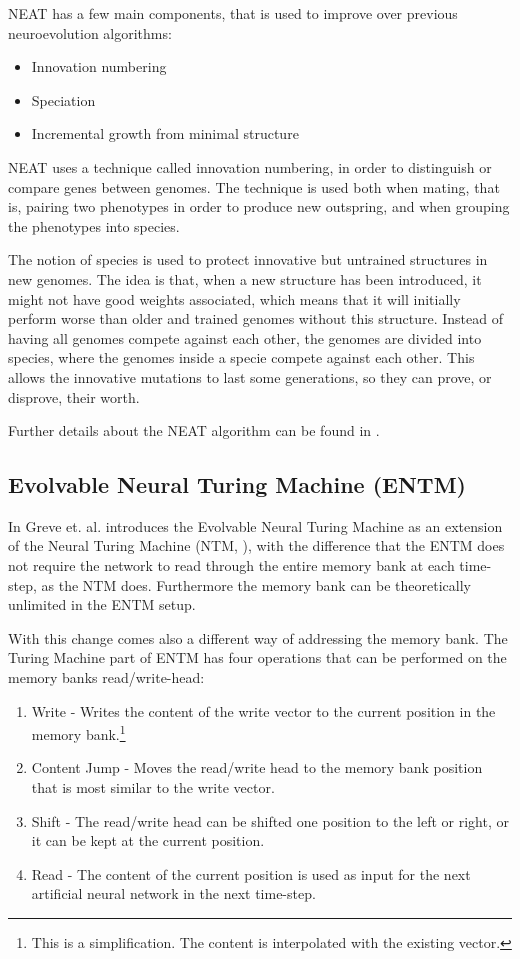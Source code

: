 \newpar NEAT has a few main components, that is used to improve over previous neuroevolution algorithms:

\begin{itemize}
	\item Innovation numbering
	\item Speciation
	\item Incremental growth from minimal structure
\end{itemize}

\newpar NEAT uses a technique called innovation numbering, in order to distinguish or compare genes between genomes. The technique is used both when mating, that is, pairing two phenotypes in order to produce new outspring, and when grouping the phenotypes into species.

\newpar The notion of species is used to protect innovative but untrained structures in new genomes. The idea is that, when a new structure has been introduced, it might not have good weights associated, which means that it will initially perform worse than older and trained genomes without this structure. Instead of having all genomes compete against each other, the genomes are divided into species, where the genomes inside a specie compete against each other. This allows the innovative mutations to last some generations, so they can prove, or disprove, their worth.

\newpar Further details about the NEAT algorithm can be found in \cite{stanley2002evolving}.

\subsection{Evolvable Neural Turing Machine (ENTM)}
In \cite{greve2016evolving} Greve et. al. introduces the Evolvable Neural Turing Machine as an extension of the Neural Turing Machine (NTM, \cite{graves2014neural}), with the difference that the ENTM does not require the network to read through the entire memory bank at each time-step, as the NTM does. Furthermore the memory bank can be theoretically unlimited in the ENTM setup.

\newpar With this change comes also a different way of addressing the memory bank. The Turing Machine part of ENTM has four operations that can be performed on the memory banks read/write-head:

\begin{enumerate}
	\item Write - Writes the content of the write vector to the current position in the memory bank.\footnote{This is a simplification. The content is interpolated with the existing vector.}
	\item Content Jump - Moves the read/write head to the memory bank position that is most similar to the write vector.
	\item Shift - The read/write head can be shifted one position to the left or right, or it can be kept at the current position.
	\item Read - The content of the current position is used as input for the next artificial neural network in the next time-step.
\end{enumerate}

